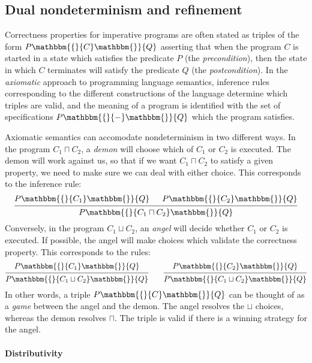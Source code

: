 \documentclass[sigplan,10pt,review,anonymous]{acmart}
\newcommand{\htr}[3]{{ {#1} \mathbbm{\{} {#2} \mathbbm{\}} {#3} }}
\begin{document}
\subsection{Dual nondeterminism and refinement} \label{sec:refcal} %


Correctness properties for imperative programs
are often stated as triples of the form $\htr{P}{C}{Q}$
asserting that
when the program $C$ is started in a state which
satisfies the predicate $P$ (the \emph{precondition}),
then the state in which $C$ terminates
will satisfy the predicate $Q$ (the \emph{postcondition}).
In the \emph{axiomatic} approach to programming language semantics,
inference rules
corresponding to the different constructions of the language
determine which triples are valid,
and the meaning of a program is identified with
the set of specifications $\htr{P}{-}{Q}$
which the program satisfies.

Axiomatic semantics
can accomodate nondeterminism in two different ways.
In the program $C_1 \sqcap C_2$,
a \emph{demon} will choose which of $C_1$ or $C_2$ is executed.
The demon will work against us,
so that if we want $C_1 \sqcap C_2$ to satisfy a given property,
we need to make sure we can deal with either choice.
This corresponds to the inference rule:
\[
  \begin{prooftree}
    \hypo{\htr{P}{C_1}{Q}}
    \hypo{\htr{P}{C_2}{Q}}
    \infer2{\htr{P}{C_1 \sqcap C_2}{Q}}
  \end{prooftree}
\]
Conversely,
in the program $C_1 \sqcup C_2$,
an \emph{angel} will decide whether $C_1$ or $C_2$ is executed.
If possible,
the angel will make choices which validate
the correctness property.
This corresponds to the rules:
\[
  \begin{prooftree}
    \hypo{\htr{P}{C_1}{Q}}
    \infer1{\htr{P}{C_1 \sqcup C_2}{Q}}
  \end{prooftree}
  \qquad
  \begin{prooftree}
    \hypo{\htr{P}{C_2}{Q}}
    \infer1{\htr{P}{C_1 \sqcup C_2}{Q}}
  \end{prooftree}
\]
In other words,
a triple $\htr{P}{C}{Q}$
can be thought of as a \emph{game}
between the angel and the demon.
The angel resolves the $\sqcup$ choices,
whereas the demon resolves $\sqcap$.
The triple is valid if there is a winning strategy
for the angel.


\paragraph{Distributivity} %
\end{document}
